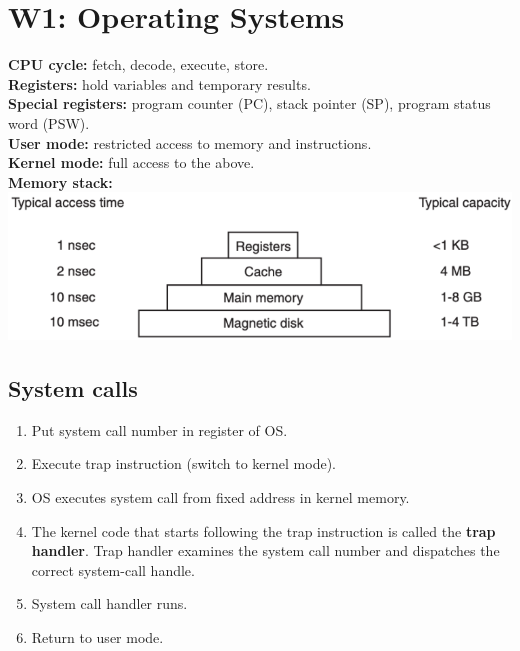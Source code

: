 \section{W1: Operating Systems}
\textbf{CPU cycle:} fetch, decode, execute, store.\\
\textbf{Registers:} hold variables and temporary results.\\
\textbf{Special registers:} program counter (PC), stack pointer (SP), program status word (PSW).\\
\textbf{User mode:} restricted access to memory and instructions.\\
\textbf{Kernel mode:} full access to the above.\\
\textbf{Memory stack:}\\
\includegraphics[width=\linewidth]{figs/memory-stack.png}

\subsection{System calls}
\begin{enumerate}
    \item Put system call number in register of OS.
    \item Execute trap instruction (switch to kernel mode).
    \item OS executes system call from fixed address in kernel memory.
    \item The kernel code that starts following the trap instruction is called the \textbf{trap handler}. Trap handler examines the system call number and dispatches the correct system-call handle.
    \item System call handler runs.
    \item Return to user mode.
\end{enumerate}
